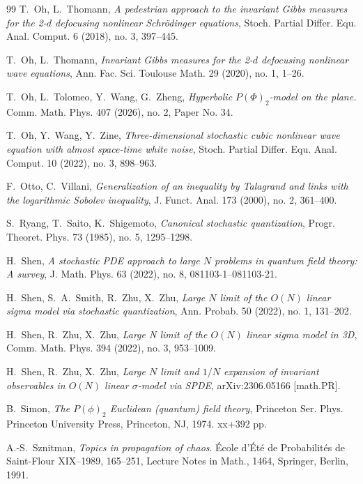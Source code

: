 \documentclass[letterpaper, 11pt,  reqno]{amsart}
\newcommand{\1}{\hspace{0.5mm}\text{I}\hspace{0.2mm}}
\newcommand{\s}{\sigma}
\numberwithin{equation}{section}
\numberwithin{theorem}{section}
\begin{document}
\begin{thebibliography}{99}
T.~Oh, L.~Thomann,
{\it A pedestrian approach to the invariant Gibbs measures for the 2-$d$ defocusing nonlinear Schr\"odinger equations}, 
Stoch. Partial Differ. Equ. Anal. Comput. 6 (2018), no. 3, 397--445.


T.~Oh, L.~Thomann,
{\it Invariant Gibbs measures for the 2-$d$ defocusing nonlinear wave equations}, 
Ann. Fac. Sci. Toulouse Math.  29 (2020), no. 1, 1--26.


T.~Oh, L.~Tolomeo, Y.~Wang, G.~Zheng,
{\it Hyperbolic $P(\Phi)_2$-model on the plane.}
Comm. Math. Phys.
 407 (2026), no. 2, Paper No. 34. 


T.~Oh, Y.~Wang, Y.~Zine,
{\it Three-dimensional stochastic cubic nonlinear wave equation with almost space-time white noise}, 
Stoch. Partial Differ. Equ. Anal. Comput. 10 (2022), no. 3, 898--963. 


F.~Otto, C.~Villani, 
{\it Generalization of an inequality by Talagrand and links with the logarithmic Sobolev inequality},
J. Funct. Anal. 173 (2000), no. 2, 361--400. 

S.~Ryang, T.~Saito, K.~Shigemoto,
{\it Canonical stochastic quantization}, 
Progr. Theoret. Phys. 73 (1985), no. 5, 1295--1298.


H.~Shen,  
{\it A stochastic PDE approach to large $N$ problems in quantum field theory: A survey}, 
J. Math. Phys. 63 (2022), no. 8, 081103-1--081103-21. 


H.~Shen, S.~A.~Smith, R.~Zhu, X.~Zhu,
{\it Large $N$ limit of the $O(N)$ linear sigma model via stochastic quantization}, 
Ann. Probab. 50 (2022), no. 1, 131--202.


H.~Shen, R.~Zhu, X.~Zhu, 
{\it Large N limit of the $O(N)$ linear sigma model in 3D}, 
Comm. Math. Phys. 394 (2022), no. 3, 953--1009. 


H.~Shen, R.~Zhu, X.~Zhu, 
{\it Large $N$ limit and $1/N$ expansion of invariant observables in $O(N)$ linear $\s$-model via SPDE}, 
arXiv:2306.05166 [math.PR].


B.~Simon,
{\it The $P (\phi)_2$ Euclidean (quantum) field theory}, 
Princeton Ser. Phys.
Princeton University Press, Princeton, NJ, 1974. xx+392 pp.

A.-S.~Sznitman, 
{\it Topics in propagation of chaos}. \'Ecole d'\'Et\'e de Probabilit\'es de Saint-Flour XIX--1989, 165--251, Lecture Notes in Math., 1464, Springer, Berlin, 1991. 


\end{thebibliography}
\end{document}
